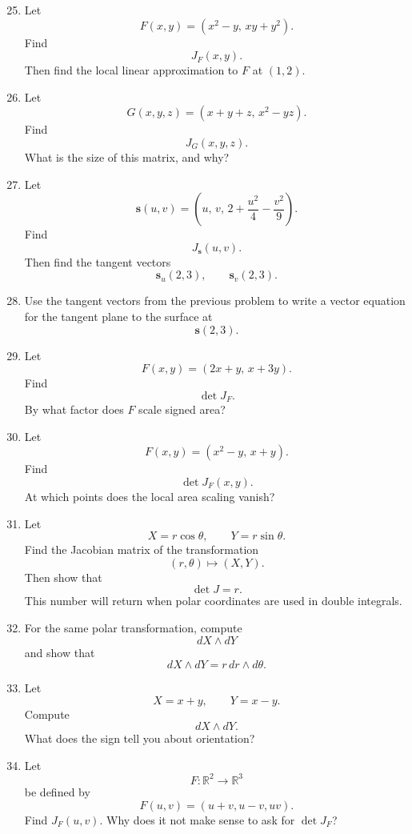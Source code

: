 \begin{enumerate}
\setcounter{enumi}{24}

\item Let
\[
    F(x,y)=
    \left(
        x^2-y,\,
        xy+y^2
    \right).
\]
Find
\[
    J_F(x,y).
\]
Then find the local linear approximation to \(F\) at \((1,2)\).

\item Let
\[
    G(x,y,z)=
    \left(
        x+y+z,\,
        x^2-yz
    \right).
\]
Find
\[
    J_G(x,y,z).
\]
What is the size of this matrix, and why?

\item Let
\[
    \mathbf s(u,v)=
    \left(
        u,\,
        v,\,
        2+\frac{u^2}{4}-\frac{v^2}{9}
    \right).
\]
Find
\[
    J_{\mathbf s}(u,v).
\]
Then find the tangent vectors
\[
    \mathbf s_u(2,3),
    \qquad
    \mathbf s_v(2,3).
\]

\item Use the tangent vectors from the previous problem to write a vector equation
for the tangent plane to the surface at
\[
    \mathbf s(2,3).
\]

\item Let
\[
    F(x,y)=
    \left(
        2x+y,\,
        x+3y
    \right).
\]
Find
\[
    \det J_F.
\]
By what factor does \(F\) scale signed area?

\item Let
\[
    F(x,y)=
    \left(
        x^2-y,\,
        x+y
    \right).
\]
Find
\[
    \det J_F(x,y).
\]
At which points does the local area scaling vanish?

\item Let
\[
    X=r\cos\theta,
    \qquad
    Y=r\sin\theta.
\]
Find the Jacobian matrix of the transformation
\[
    (r,\theta)\mapsto (X,Y).
\]
Then show that
\[
    \det J = r.
\]
This number will return when polar coordinates are used in double integrals.

\item For the same polar transformation, compute
\[
    dX\wedge dY
\]
and show that
\[
    dX\wedge dY=r\,dr\wedge d\theta.
\]

\item Let
\[
    X=x+y,
    \qquad
    Y=x-y.
\]
Compute
\[
    dX\wedge dY.
\]
What does the sign tell you about orientation?

\item Let
\[
    F:\mathbb R^2\to\mathbb R^3
\]
be defined by
\[
    F(u,v)=(u+v,u-v,uv).
\]
Find \(J_F(u,v)\).  Why does it not make sense to ask for \(\det J_F\)?
\end{enumerate}

